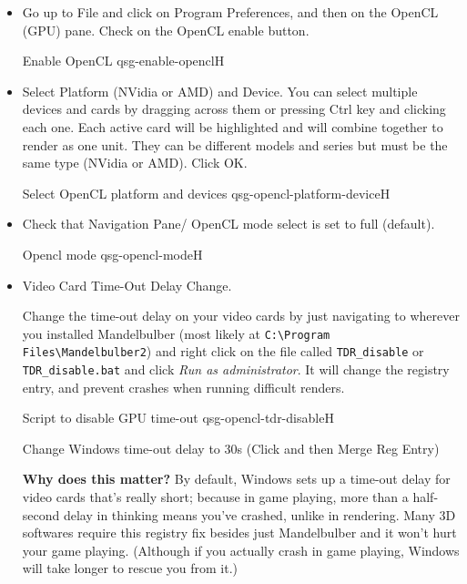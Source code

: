\begin{itemize}
	\item   Go up to File and click on Program Preferences, and then on the OpenCL (GPU) pane. Check on the OpenCL enable button.

{Enable OpenCL}
{qsg-enable-opencl}{H}

	 \item Select Platform (NVidia or AMD) and Device. You can select multiple devices and cards by dragging across them or pressing Ctrl key and clicking each one. Each active card will be highlighted and will combine together to render as one unit. They can be different models and series but must be the same type (NVidia or AMD). Click OK.
	 
	 {Select OpenCL platform and devices}
	 {qsg-opencl-platform-device}{H}

     \item Check that Navigation Pane/ OpenCL mode select is set to full (default).
     
     {Opencl mode}
     {qsg-opencl-mode}{H}
     
      \item  Video Card Time-Out Delay Change. 

	Change the time-out delay on your video cards by just navigating to wherever you installed Mandelbulber (most likely at \texttt{C:\textbackslash Program Files\textbackslash Mandelbulber2}) and right click on the file called \texttt{TDR\_disable} or \texttt{TDR\_disable.bat} and click \emph{Run as administrator}. It will change the registry entry, and prevent crashes when running difficult renders. 	
		 
	{Script to disable GPU time-out}
	{qsg-opencl-tdr-disable}{H}
	
	Change Windows time-out delay to 30s (Click and then Merge Reg Entry)

\textbf{Why does this matter?} By default, Windows sets up a time-out delay for video cards that's really short; because in game playing, more than a half-second delay in thinking means you've crashed, unlike in rendering. Many 3D softwares require this registry fix besides just Mandelbulber and it won't hurt your game playing. (Although if you actually crash in game playing, Windows will take longer to rescue you from it.) 
\end{itemize}


